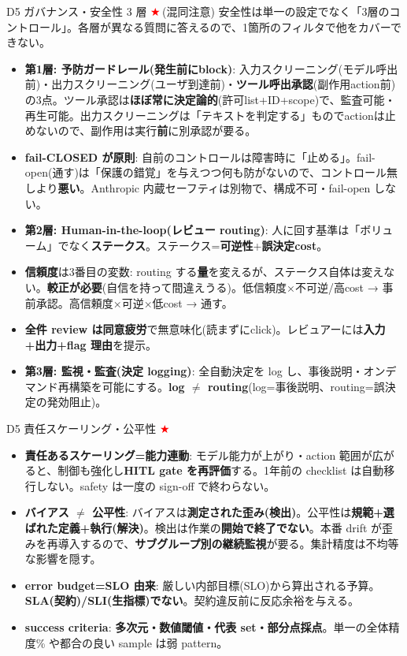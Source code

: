 \documentclass[10pt,a4paper]{article}
\newcommand{\R}[1]{\textcolor{cred}{\textbf{#1}}}
\newcommand{\B}[1]{\textcolor{cblue}{\textbf{#1}}}
\newcommand{\stc}{\textcolor{red}{\ensuremath{\bigstar}}\,}
\begin{document}
\begin{minipage}[t]{0.333\textwidth}

\begin{boxred}{D5 ガバナンス・安全性 3 層 \stc (混同注意)}
安全性は単一の設定でなく「3層のコントロール」。各層が異なる質問に答えるので、1箇所のフィルタで他をカバーできない。
\begin{itemize}
\item \R{第1層: 予防ガードレール(発生前にblock)}: 入力スクリーニング(モデル呼出前)・出力スクリーニング(ユーザ到達前)・\B{ツール呼出承認}(副作用action前)の3点。ツール承認は\B{ほぼ常に決定論的}(許可list+ID+scope)で、監査可能・再生可能。出力スクリーニングは「テキストを判定する」ものでactionは止めないので、副作用は実行\B{前}に別承認が要る。
\item \R{fail-CLOSED が原則}: 自前のコントロールは障害時に「止める」。fail-open(通す)は「保護の錯覚」を与えつつ何も防がないので、コントロール無しより\R{悪い}。Anthropic 内蔵セーフティは別物で、構成不可・fail-open しない。
\item \R{第2層: Human-in-the-loop(レビュー routing)}: 人に回す基準は「ボリューム」でなく\R{ステークス}。ステークス=\B{可逆性}+\B{誤決定cost}。
\item \R{信頼度}は3番目の変数: routing する\B{量}を変えるが、ステークス自体は変えない。\B{較正が必要}(自信を持って間違えうる)。低信頼度×不可逆/高cost → 事前承認。高信頼度×可逆×低cost → 通す。
\item \R{全件 review は同意疲労}で無意味化(読まずにclick)。レビュアーには\B{入力+出力+flag 理由}を提示。
\item \R{第3層: 監視・監査(決定 logging)}: 全自動決定を log し、事後説明・オンデマンド再構築を可能にする。\B{log $\neq$ routing}(log=事後説明、routing=誤決定の発効阻止)。
\end{itemize}
\end{boxred}

\begin{boxred}{D5 責任スケーリング・公平性 \stc}
\begin{itemize}
\item \R{責任あるスケーリング=能力連動}: モデル能力が上がり・action 範囲が広がると、制御も強化し\B{HITL gate を再評価}する。1年前の checklist は自動移行しない。safety は一度の sign-off で終わらない。
\item \R{バイアス $\neq$ 公平性}: バイアスは\B{測定された歪み(検出)}。公平性は\B{規範+選ばれた定義+執行(解決)}。検出は作業の\B{開始で終了でない}。本番 drift が歪みを再導入するので、\B{サブグループ別の継続監視}が要る。集計精度は不均等な影響を隠す。
\item \R{error budget=SLO 由来}: 厳しい内部目標(SLO)から算出される予算。\B{SLA(契約)/SLI(生指標)でない}。契約違反前に反応余裕を与える。
\item \R{success criteria}: \B{多次元・数値閾値・代表 set・部分点採点}。単一の全体精度\% や都合の良い sample は弱 pattern。
\end{itemize}
\end{boxred}

\end{minipage}\hfill
\end{document}
